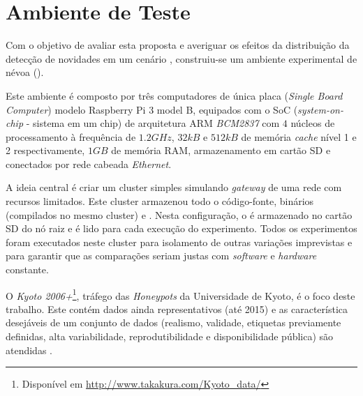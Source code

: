 
\section{Ambiente de Teste}\label{sec:ambiente}

Com o objetivo de avaliar esta proposta e averiguar os efeitos da distribuição
da detecção de novidades em um cenário \iot, construiu-se um ambiente
experimental de névoa (\fog).

Este ambiente é composto por três computadores de única placa (\emph{Single
Board Computer}) modelo Raspberry Pi 3 model B, equipados com o SoC
(\emph{system-on-chip} - sistema em um chip) de arquitetura ARM \emph{BCM2837} com
$4$ núcleos de processamento à frequência de $1.2GHz$, $32kB$ e $512kB$ de
memória \emph{cache} nível 1 e 2 respectivamente, $1GB$ de memória RAM,
armazenamento em cartão SD e conectados por rede cabeada \emph{Ethernet}.

A ideia central é criar um cluster simples simulando \emph{gateway} de uma rede
\iot com recursos limitados.
Este cluster armazenou todo o código-fonte, binários (compilados no mesmo cluster) e
\dataset.
Nesta configuração, o \dataset é armazenado no cartão SD do nó raiz e é lido para
cada execução do experimento.
Todos os experimentos foram executados neste cluster para isolamento de outras
variações imprevistas e para garantir que as comparações seriam justas com
\emph{software} e \emph{hardware} constante.


O \dataset \emph{Kyoto 2006+}\footnote{Disponível em
\url{http://www.takakura.com/Kyoto\_data/}}, tráfego das \emph{Honeypots} da
Universidade de Kyoto, é o foco deste trabalho.
Este \dataset contém dados ainda representativos (até 2015) e as característica
desejáveis de um conjunto de dados (realismo, validade, etiquetas previamente
definidas, alta variabilidade, reprodutibilidade e disponibilidade pública) são
atendidas \cite{KyotoDataset,Song2011kyoto}.

